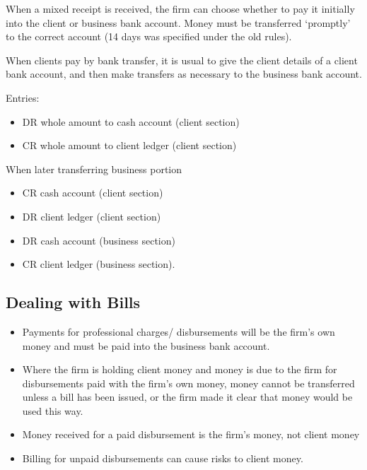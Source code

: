 \documentclass[
]{article}
\providecommand{\tightlist}{%
  \setlength{\itemsep}{0pt}\setlength{\parskip}{0pt}}
\begin{document}
When a mixed receipt is received, the firm can choose whether to pay it
initially into the client or business bank account. Money must be
transferred `promptly' to the correct account (14 days was specified
under the old rules).

When clients pay by bank transfer, it is usual to give the client
details of a client bank account, and then make transfers as necessary
to the business bank account.

Entries:

\begin{itemize}
\tightlist
\item
  DR whole amount to cash account (client section)
\item
  CR whole amount to client ledger (client section)
\end{itemize}

When later transferring business portion

\begin{itemize}
\tightlist
\item
  CR cash account (client section)
\item
  DR client ledger (client section)
\item
  DR cash account (business section)
\item
  CR client ledger (business section).
\end{itemize}

\hypertarget{dealing-with-bills}{%
\subsection{Dealing with Bills}\label{dealing-with-bills}}

\begin{itemize}
\tightlist
\item
  Payments for professional charges/ disbursements will be the firm's
  own money and must be paid into the business bank account.
\item
  Where the firm is holding client money and money is due to the firm
  for disbursements paid with the firm's own money, money cannot be
  transferred unless a bill has been issued, or the firm made it clear
  that money would be used this way.
\item
  Money received for a paid disbursement is the firm's money, not client
  money
\item
  Billing for unpaid disbursements can cause risks to client money.
\end{itemize}
\end{document}
